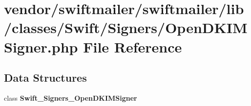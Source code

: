 \section{vendor/swiftmailer/swiftmailer/lib/classes/\+Swift/\+Signers/\+Open\+D\+K\+I\+M\+Signer.php File Reference}
\label{_open_d_k_i_m_signer_8php}
\subsection*{Data Structures}
\begin{DoxyCompactItemize}
\item 
class {\bf Swift\+\_\+\+Signers\+\_\+\+Open\+D\+K\+I\+M\+Signer}
\end{DoxyCompactItemize}
